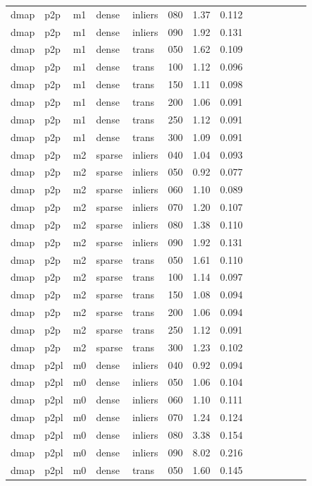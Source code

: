 \begin{table}[htbp]
\begin{tabular}{llllllrrrrrrrr}
  dmap & p2p & m1 & dense & inliers & 080 & 1.37 & 0.112 \\
  dmap & p2p & m1 & dense & inliers & 090 & 1.92 & 0.131 \\
  dmap & p2p & m1 & dense & trans & 050 & 1.62 & 0.109 \\
  dmap & p2p & m1 & dense & trans & 100 & 1.12 & 0.096 \\
  dmap & p2p & m1 & dense & trans & 150 & 1.11 & 0.098 \\
  dmap & p2p & m1 & dense & trans & 200 & 1.06 & 0.091 \\
  dmap & p2p & m1 & dense & trans & 250 & 1.12 & 0.091 \\
  dmap & p2p & m1 & dense & trans & 300 & 1.09 & 0.091 \\
  dmap & p2p & m2 & sparse & inliers & 040 & 1.04 & 0.093 \\
  dmap & p2p & m2 & sparse & inliers & 050 & 0.92 & 0.077 \\
  dmap & p2p & m2 & sparse & inliers & 060 & 1.10 & 0.089 \\
  dmap & p2p & m2 & sparse & inliers & 070 & 1.20 & 0.107 \\
  dmap & p2p & m2 & sparse & inliers & 080 & 1.38 & 0.110 \\
  dmap & p2p & m2 & sparse & inliers & 090 & 1.92 & 0.131 \\
  dmap & p2p & m2 & sparse & trans & 050 & 1.61 & 0.110 \\
  dmap & p2p & m2 & sparse & trans & 100 & 1.14 & 0.097 \\
  dmap & p2p & m2 & sparse & trans & 150 & 1.08 & 0.094 \\
  dmap & p2p & m2 & sparse & trans & 200 & 1.06 & 0.094 \\
  dmap & p2p & m2 & sparse & trans & 250 & 1.12 & 0.091 \\
  dmap & p2p & m2 & sparse & trans & 300 & 1.23 & 0.102 \\
  dmap & p2pl & m0 & dense & inliers & 040 & 0.92 & 0.094 \\
  dmap & p2pl & m0 & dense & inliers & 050 & 1.06 & 0.104 \\
  dmap & p2pl & m0 & dense & inliers & 060 & 1.10 & 0.111 \\
  dmap & p2pl & m0 & dense & inliers & 070 & 1.24 & 0.124 \\
  dmap & p2pl & m0 & dense & inliers & 080 & 3.38 & 0.154 \\
  dmap & p2pl & m0 & dense & inliers & 090 & 8.02 & 0.216 \\
  dmap & p2pl & m0 & dense & trans & 050 & 1.60 & 0.145 \\

\end{tabular}
\end{table}
